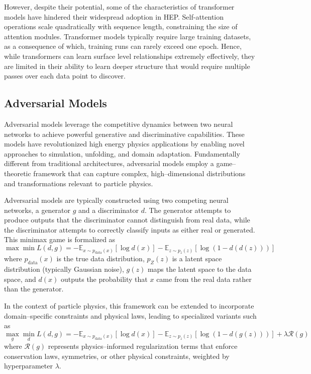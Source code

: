         However, despite their potential, some of the characteristics of transformer models have hindered their widespread adoption in HEP.
        Self-attention operations scale quadratically with sequence length, constraining the size of attention modules.
        Transformer models typically require large training datasets, as a consequence of which, training runs can rarely exceed one epoch.
        Hence, while transformers can learn surface level relationships extremely effectively, they are limited in their ability to learn deeper structure that would require multiple passes over each data point to discover.

\subsection{Adversarial Models}
    Adversarial models leverage the competitive dynamics between two neural networks to achieve powerful generative and discriminative capabilities.
    These models have revolutionized high energy physics applications by enabling novel approaches to simulation, unfolding, and domain adaptation.
    Fundamentally different from traditional architectures, adversarial models employ a game--theoretic framework that can capture complex, high--dimensional distributions and transformations relevant to particle physics.

    Adversarial models are typically constructed using two competing neural networks, a generator \(g\) and a discriminator \(d\).
    The generator attempts to produce outputs that the discriminator cannot distinguish from real data, while the discriminator attempts to correctly classify inputs as either real or generated.
    This minimax game is formalized as
    \begin{equation}
        \max \min L(d, g) = -\mathbb{E}_{x \sim p_{\text{data}}(x)}[\log d(x)] - \mathbb{E}_{z \sim p_z(z)}[\log(1 - d(d(z)))]
    \end{equation}
    where \(p_{\text{data}}(x)\) is the true data distribution, \(p_Z(z)\) is a latent space distribution (typically Gaussian noise), \(g(z)\) maps the latent space to the data space, and \(d(x)\) outputs the probability that
    \(x\) came from the real data rather than the generator.

    In the context of particle physics, this framework can be extended to incorporate domain--specific constraints and physical laws, leading to specialized variants such as
    \begin{equation}
        \max_g \min_d L(d, g) = -\mathbb{E}_{x \sim p_{\text{data}}(x)}[\log d(x)] - \mathbb{E}_{z \sim p_z(z)}[\log(1 - d(g(z)))] + \lambda \mathcal{R}(g)
    \end{equation}
    where \(\mathcal{R}(g)\) represents physics--informed regularization terms that enforce conservation laws, symmetries, or other physical constraints, weighted by hyperparameter \(\lambda\).
    

